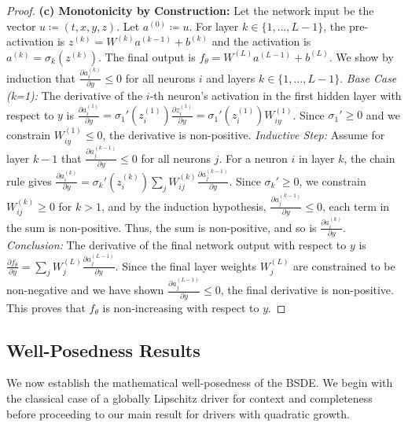 \documentclass[qian]{imsart}
\theoremstyle{plain}
\theoremstyle{definition}
\begin{document}
\begin{proof}
\textbf{(c) Monotonicity by Construction:} Let the network input be the vector $u \coloneqq (t,x,y,z)$. Let $a^{(0)} \coloneqq u$. For layer $k \in \{1, \dots, L-1\}$, the pre-activation is $z^{(k)} = W^{(k)} a^{(k-1)} + b^{(k)}$ and the activation is $a^{(k)} = \sigma_k(z^{(k)})$. The final output is $f_\theta = W^{(L)}a^{(L-1)} + b^{(L)}$. We show by induction that $\frac{\partial a_i^{(k)}}{\partial y} \le 0$ for all neurons $i$ and layers $k \in \{1, \dots, L-1\}$.
\textit{Base Case (k=1):} The derivative of the $i$-th neuron's activation in the first hidden layer with respect to $y$ is $\frac{\partial a_i^{(1)}}{\partial y} = \sigma_1'(z_i^{(1)}) \frac{\partial z_i^{(1)}}{\partial y} = \sigma_1'(z_i^{(1)}) W_{iy}^{(1)}$. Since $\sigma_1' \ge 0$ and we constrain $W_{iy}^{(1)} \le 0$, the derivative is non-positive.
\textit{Inductive Step:} Assume for layer $k-1$ that $\frac{\partial a_j^{(k-1)}}{\partial y} \le 0$ for all neurons $j$. For a neuron $i$ in layer $k$, the chain rule gives $\frac{\partial a_i^{(k)}}{\partial y} = \sigma_k'(z_i^{(k)}) \sum_j W_{ij}^{(k)} \frac{\partial a_j^{(k-1)}}{\partial y}$. Since $\sigma_k' \ge 0$, we constrain $W_{ij}^{(k)} \ge 0$ for $k>1$, and by the induction hypothesis, $\frac{\partial a_j^{(k-1)}}{\partial y} \le 0$, each term in the sum is non-positive. Thus, the sum is non-positive, and so is $\frac{\partial a_i^{(k)}}{\partial y}$.
\textit{Conclusion:} The derivative of the final network output with respect to $y$ is $\frac{\partial f_\theta}{\partial y} = \sum_j W_{j}^{(L)} \frac{\partial a_j^{(L-1)}}{\partial y}$. Since the final layer weights $W_j^{(L)}$ are constrained to be non-negative and we have shown $\frac{\partial a_j^{(L-1)}}{\partial y} \le 0$, the final derivative is non-positive. This proves that $f_\theta$ is non-increasing with respect to $y$.
\end{proof}

\subsection{Well-Posedness Results}

We now establish the mathematical well-posedness of the BSDE. We begin with the classical case of a globally Lipschitz driver for context and completeness before proceeding to our main result for drivers with quadratic growth.
\end{document}
